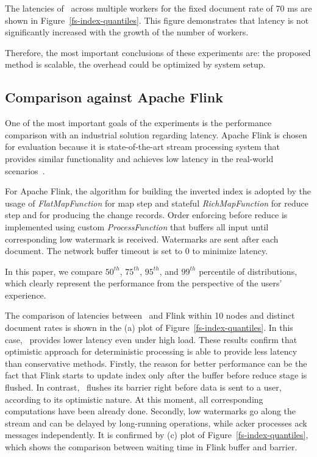 The latencies of \FlameStream\ across multiple workers for the fixed document rate of 70 ms are shown in Figure~\ref{fs-index-quantiles}. This figure demonstrates that latency is not significantly increased with the growth of the number of workers. 

Therefore, the most important conclusions of these experiments are: the proposed method is scalable, the overhead could be optimized by system setup.

\subsection{Comparison against Apache Flink}

One of the most important goals of the experiments is the performance comparison with an industrial solution regarding latency. Apache Flink is chosen for evaluation because it is state-of-the-art stream processing system that provides similar functionality and achieves low latency in the real-world scenarios~\cite{S7530084}. 

For Apache Flink, the algorithm for building the inverted index is adopted by the usage of {\it FlatMapFunction} for map step and stateful {\it RichMapFunction} for reduce step and for producing the change records. Order enforcing before reduce is implemented using custom {\it ProcessFunction} that buffers all input until corresponding low watermark is received. Watermarks are sent after each document. The network buffer timeout is set to 0 to minimize latency.

In this paper, we compare $50^{th}$, $75^{th}$, $95^{th}$, and $99^{th}$ percentile of distributions, which clearly represent the performance from the perspective of the users' experience.

The comparison of latencies between \FlameStream\ and Flink within 10 nodes and distinct document rates is shown in the (a) plot of Figure~\ref{fs-index-quantiles}. In this case, \FlameStream\ provides lower latency even under high load. These results confirm that optimistic approach for deterministic processing is able to provide less latency than conservative methods. Firstly, the reason for better performance can be the fact that Flink starts to update index only after the buffer before reduce stage is flushed. In contrast, \FlameStream\ flushes its barrier right before data is sent to a user, according to its optimistic nature. At this moment, all corresponding computations have been already done. Secondly, low watermarks go along the stream and can be delayed by long-running operations, while acker processes ack messages independently. It is confirmed by (c) plot of Figure~\ref{fs-index-quantiles}, which shows the comparison between waiting time in Flink buffer and \FlameStream barrier.

